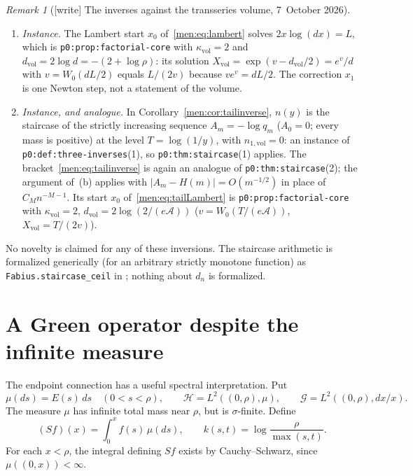 \documentclass[11pt,letterpaper]{article}
\theoremstyle{remark}\newtheorem{remark}[theorem]{Remark}
\newcommand{\HH}{\mathcal H}\newcommand{\GG}{\mathcal G}
\newcommand{\file}[1]{\nolinkurl{#1}}
\begin{document}
\begin{remark}[{[write]} The inverses against the transseries volume, 7~October 2026]
\begin{enumerate}[label=(\alph*)]
 and the mean value theorem gives $|\nu-\xi|\le K_M\xi^{-M-1}/\log\xi$ for
 a suitable $K_M$ and large $X$. For $X>d_{n_2}$ the staircase from $n_2$
 equals $N(X)$, so \file{p0:thm:staircase}(1) and the monotonicity of the
 ceiling give~\eqref{men:eq:inversebracket}.
\item \emph{Instance.} The Lambert start $x_0$ of~\eqref{men:eq:lambert}
 solves $2x\log(dx)=L$, which is \file{p0:prop:factorial-core} with
 $\kappa_{\mathrm{vol}}=2$ and $d_{\mathrm{vol}}=2\log d=-(2+\log\rho)$: its
 solution $X_{\mathrm{vol}}=\exp(v-d_{\mathrm{vol}}/2)=e^v/d$ with
 $v=W_0(dL/2)$ equals $L/(2v)$ because $ve^v=dL/2$. The correction $x_1$ is
 one Newton step, not a statement of the volume.
\item \emph{Instance, and analogue.} In Corollary~\ref{men:cor:tailinverse},
 $n(y)$ is the staircase of the strictly increasing sequence
 $A_m=-\log q_m$ ($A_0=0$; every mass is positive) at the level
 $T=\log(1/y)$, with $n_{1,\mathrm{vol}}=0$: an instance of
 \file{p0:def:three-inverses}(1), so \file{p0:thm:staircase}(1) applies. The
 bracket~\eqref{men:eq:tailinverse} is again an analogue of
 \file{p0:thm:staircase}(2); the argument of~(b) applies with
 $|A_m-H(m)|=O(m^{-1/2})$ in place of $C_Mn^{-M-1}$. Its start $x_0$
 of~\eqref{men:eq:tailLambert} is \file{p0:prop:factorial-core} with
 $\kappa_{\mathrm{vol}}=2$, $d_{\mathrm{vol}}=2\log(2/(e\mathcal A))$
 ($v=W_0(T/(e\mathcal A))$, $X_{\mathrm{vol}}=T/(2v)$).
\end{enumerate}
No novelty is claimed for any of these inversions. The staircase arithmetic
is formalized generically (for an arbitrary strictly monotone function) as
\file{Fabius.staircase_ceil} in
;
nothing about $d_n$ is formalized.
\end{remark}

\section{A Green operator despite the infinite measure}\label{men:sec:fredholm}
The endpoint connection has a useful spectral interpretation. Put
\[
 \mu(ds)=E(s)\,ds\quad(0<s<\rho),\qquad
 \HH=L^2((0,\rho),\mu),\qquad
 \GG=L^2((0,\rho),dx/x).
\]
The measure $\mu$ has infinite total mass near $\rho$, but is $\sigma$-finite. Define
\begin{equation}\label{men:eq:S}
 (Sf)(x)=\int_0^x f(s)\,\mu(ds),\qquad
 k(s,t)=\log\frac\rho{\max(s,t)}.
\end{equation}
For each $x<\rho$, the integral defining $Sf$ exists by Cauchy--Schwarz, since $\mu((0,x))<\infty$.
\end{document}

